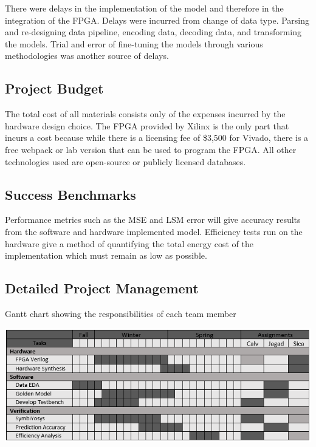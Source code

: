 \documentclass[12pt,titlepage]{article}
\begin{document}
There were delays in the implementation of the model and therefore in the integration of the FPGA. Delays were incurred from change of data
type. Parsing and re-designing data pipeline, encoding data, decoding data, and transforming the models. Trial and error of fine-tuning
the models through various methodologies was another source of delays.

\subsection{Project Budget}
The total cost of all materials consists only of the expenses incurred by the hardware design choice. The FPGA provided by Xilinx is the only part that
incurs a cost because while there is a licensing fee of \$3,500 for Vivado, there is a free webpack or lab version that can be used to program the FPGA.
All other technologies used are open-source or publicly licensed databases.

\subsection{Success Benchmarks}
Performance metrics such as the MSE and LSM error will give accuracy results from the software and hardware implemented model. Efficiency tests run on the
hardware give a method of quantifying the total energy cost of the implementation which must remain as low as possible. 




\newpage
\begin{appendices}
\section{Detailed Project Management}
\begin{table}[!htb]
	\caption{Gantt chart showing the responsibilities of each team member}
	\label{tbl:gantt}
	\includegraphics[width=\linewidth]{gantt.png}
\end{table}
\end{appendices}
\end{document}
